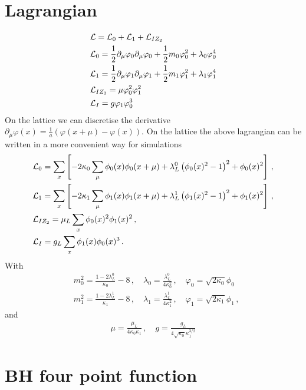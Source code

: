 \documentclass[10pt,a4paper]{article}
\begin{document}
 
 \section{Lagrangian}
 \begin{align}
 & {\cal L}= {\cal L}_0+ {\cal L}_1+  {\cal L}_{IZ_2} \\
 &{\cal L}_0= \frac{1}{2} \partial_\mu \varphi_0\partial_\mu \varphi_0 +\frac{1}{2}m_0 \varphi_0^2 +\lambda_0 \varphi_0^4 \\
 &{\cal L}_1=\frac{1}{2} \partial_\mu \varphi_1\partial_\mu \varphi_1 +\frac{1}{2}m_1 \varphi_1^2+\lambda_1 \varphi_1^4 \\
 &{\cal L}_{IZ_2}= \mu \varphi_0^2 \varphi_1^2 \\
  &{\cal L}_{I}= g \varphi_1 \varphi_0^3
 \end{align}
On the lattice we can discretise the derivative $\partial_\mu \varphi(x)=\frac{1}{a}(\varphi(x+\mu)-\varphi(x)) $.
On the lattice the above lagrangian can be written in a more convenient way for simulations
\begin{align}
 &{\cal L}_0= \sum_{x}\left[ -2\kappa_0\sum_\mu \phi_0(x) \phi_0({x+\mu}) +\lambda_L^0 \left( \phi_0(x)^2-1\right)^2+ \phi_0(x)^2  \right]\,,\\
 &{\cal L}_1= \sum_{x}\left[ -2\kappa_1\sum_\mu \phi_1(x) \phi_1({x+\mu}) +\lambda_L^1 \left( \phi_1(x)^2-1\right)^2+ \phi_1(x)^2  \right]\,,\\
 &{\cal L}_{IZ_2}= \mu_L  \sum_{x} \phi_0(x)^2 \phi_1(x)^2 \,,\\
  &{\cal L}_{I}= g_L \sum_{x} \phi_1(x) \phi_0(x)^3 \,.
 \end{align}
With
\begin{align}
& m_0^2=\frac{1-2\lambda_L^0}{\kappa_0}-8\,,\quad \lambda_0=\frac{\lambda_L^0}{4\kappa_0^2}\,,\quad \varphi_0=\sqrt{2\kappa_0}\phi_0\\
& m_1^2=\frac{1-2\lambda_L^1}{\kappa_1}-8\,,\quad \lambda_1=\frac{\lambda_L^1}{4\kappa_1^2}
\,,\quad \varphi_1=\sqrt{2\kappa_1}\phi_1 \,,
 \end{align}
 and
 \begin{align}
\mu=\frac{\mu_L}{4\kappa_0\kappa_1} \,,\quad g=\frac{g_L}{4\sqrt{\kappa_0}\kappa_1^{3/2}}
 \end{align}
 
\section{BH four point function}
 
\end{document}
